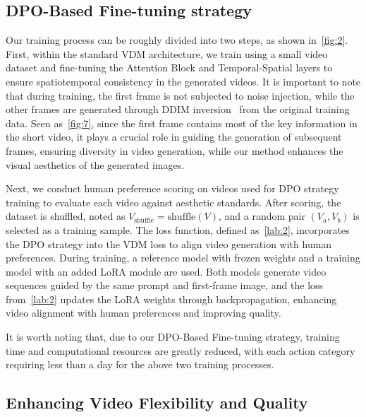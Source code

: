 \subsection{DPO-Based Fine-tuning strategy}
\label{sec:w}

Our training process can be roughly divided into two steps, as shown in~\cref{fig:2}. First, within the standard VDM architecture, we train using a small video dataset and fine-tuning the Attention Block and Temporal-Spatial layers to ensure spatiotemporal consistency in the generated videos. It is important to note that during training, the first frame is not subjected to noise injection, while the other frames are generated through DDIM inversion~\cite{song2020denoising} from the original training data. Seen as~\cref{fig:7}, since the first frame contains most of the key information in the short video, it plays a crucial role in guiding the generation of subsequent frames, ensuring diversity in video generation, while our method enhances the visual aesthetics of the generated images.

Next, we conduct human preference scoring on videos used for DPO strategy training to evaluate each video against aesthetic standards. After scoring, the dataset is shuffled, noted as \( V_{\text{shuffle}} = \text{shuffle}(V) \), and a random pair \( (V_a, V_b) \) is selected as a training sample. The loss function, defined as~\cref{lab:2}, incorporates the DPO strategy into the VDM loss to align video generation with human preferences. During training, a reference model with frozen weights and a training model with an added LoRA module are used. Both models generate video sequences guided by the same prompt and first-frame image, and the loss from~\cref{lab:2} updates the LoRA weights through backpropagation, enhancing video alignment with human preferences and improving quality.

It is worth noting that, due to our DPO-Based Fine-tuning strategy, training time and computational resources are greatly reduced, with each action category requiring less than a day for the above two training processes.



\subsection{Enhancing Video Flexibility and Quality}
\label{sec:e}

